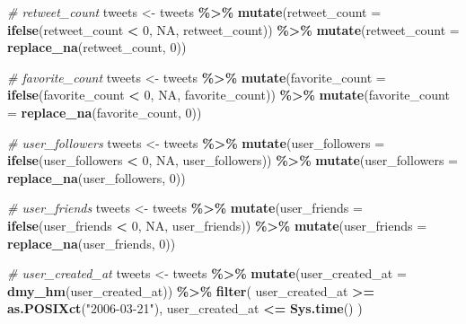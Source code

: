 \documentclass[
]{article}
\newenvironment{Shaded}{\begin{snugshade}}{\end{snugshade}}
\newcommand{\AttributeTok}[1]{\textcolor[rgb]{0.13,0.29,0.53}{#1}}
\newcommand{\CommentTok}[1]{\textcolor[rgb]{0.56,0.35,0.01}{\textit{#1}}}
\newcommand{\ConstantTok}[1]{\textcolor[rgb]{0.56,0.35,0.01}{#1}}
\newcommand{\DecValTok}[1]{\textcolor[rgb]{0.00,0.00,0.81}{#1}}
\newcommand{\FunctionTok}[1]{\textcolor[rgb]{0.13,0.29,0.53}{\textbf{#1}}}
\newcommand{\NormalTok}[1]{#1}
\newcommand{\OtherTok}[1]{\textcolor[rgb]{0.56,0.35,0.01}{#1}}
\newcommand{\SpecialCharTok}[1]{\textcolor[rgb]{0.81,0.36,0.00}{\textbf{#1}}}
\newcommand{\StringTok}[1]{\textcolor[rgb]{0.31,0.60,0.02}{#1}}
\begin{document}
\begin{Shaded}
\begin{Highlighting}[]
\CommentTok{\# retweet\_count}
\NormalTok{tweets }\OtherTok{\textless{}{-}}\NormalTok{ tweets }\SpecialCharTok{\%\textgreater{}\%}
  \FunctionTok{mutate}\NormalTok{(}\AttributeTok{retweet\_count =} \FunctionTok{ifelse}\NormalTok{(retweet\_count }\SpecialCharTok{\textless{}} \DecValTok{0}\NormalTok{, }\ConstantTok{NA}\NormalTok{, retweet\_count)) }\SpecialCharTok{\%\textgreater{}\%}
  \FunctionTok{mutate}\NormalTok{(}\AttributeTok{retweet\_count =} \FunctionTok{replace\_na}\NormalTok{(retweet\_count, }\DecValTok{0}\NormalTok{))}

\CommentTok{\# favorite\_count}
\NormalTok{tweets }\OtherTok{\textless{}{-}}\NormalTok{ tweets }\SpecialCharTok{\%\textgreater{}\%}
  \FunctionTok{mutate}\NormalTok{(}\AttributeTok{favorite\_count =} \FunctionTok{ifelse}\NormalTok{(favorite\_count }\SpecialCharTok{\textless{}} \DecValTok{0}\NormalTok{, }\ConstantTok{NA}\NormalTok{, favorite\_count)) }\SpecialCharTok{\%\textgreater{}\%}
  \FunctionTok{mutate}\NormalTok{(}\AttributeTok{favorite\_count =} \FunctionTok{replace\_na}\NormalTok{(favorite\_count, }\DecValTok{0}\NormalTok{))}

\CommentTok{\# user\_followers}
\NormalTok{tweets }\OtherTok{\textless{}{-}}\NormalTok{ tweets }\SpecialCharTok{\%\textgreater{}\%}
  \FunctionTok{mutate}\NormalTok{(}\AttributeTok{user\_followers =} \FunctionTok{ifelse}\NormalTok{(user\_followers }\SpecialCharTok{\textless{}} \DecValTok{0}\NormalTok{, }\ConstantTok{NA}\NormalTok{, user\_followers)) }\SpecialCharTok{\%\textgreater{}\%}
  \FunctionTok{mutate}\NormalTok{(}\AttributeTok{user\_followers =} \FunctionTok{replace\_na}\NormalTok{(user\_followers, }\DecValTok{0}\NormalTok{))}

\CommentTok{\# user\_friends}
\NormalTok{tweets }\OtherTok{\textless{}{-}}\NormalTok{ tweets }\SpecialCharTok{\%\textgreater{}\%}
  \FunctionTok{mutate}\NormalTok{(}\AttributeTok{user\_friends =} \FunctionTok{ifelse}\NormalTok{(user\_friends }\SpecialCharTok{\textless{}} \DecValTok{0}\NormalTok{, }\ConstantTok{NA}\NormalTok{, user\_friends)) }\SpecialCharTok{\%\textgreater{}\%}
  \FunctionTok{mutate}\NormalTok{(}\AttributeTok{user\_friends =} \FunctionTok{replace\_na}\NormalTok{(user\_friends, }\DecValTok{0}\NormalTok{))}

\CommentTok{\# user\_created\_at}
\NormalTok{tweets }\OtherTok{\textless{}{-}}\NormalTok{ tweets }\SpecialCharTok{\%\textgreater{}\%}
  \FunctionTok{mutate}\NormalTok{(}\AttributeTok{user\_created\_at =} \FunctionTok{dmy\_hm}\NormalTok{(user\_created\_at)) }\SpecialCharTok{\%\textgreater{}\%}
  \FunctionTok{filter}\NormalTok{(}
\NormalTok{    user\_created\_at }\SpecialCharTok{\textgreater{}=} \FunctionTok{as.POSIXct}\NormalTok{(}\StringTok{"2006{-}03{-}21"}\NormalTok{),}
\NormalTok{    user\_created\_at }\SpecialCharTok{\textless{}=} \FunctionTok{Sys.time}\NormalTok{()}
\NormalTok{  )}


\end{Highlighting}
\end{Shaded}
\end{document}
